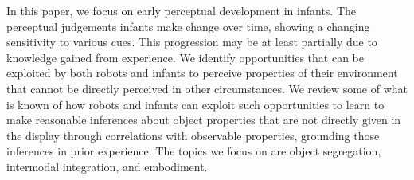 In this paper, we focus on early perceptual development in infants.  The
perceptual judgements infants make change over time, showing
a changing sensitivity to various cues. This progression
may be at least partially due to knowledge gained
from experience.
%
%
%
%
We identify opportunities that can be exploited by both robots and
infants to perceive properties of their environment that cannot be
directly perceived in other circumstances.  We review some of what is
known of how robots and infants can exploit such opportunities to
learn to make reasonable inferences
%
%
about object properties that are not directly given in the display
%
through correlations
with observable properties, grounding those inferences in prior
experience.
%
The topics we focus on are object segregation,
intermodal integration, and embodiment.









